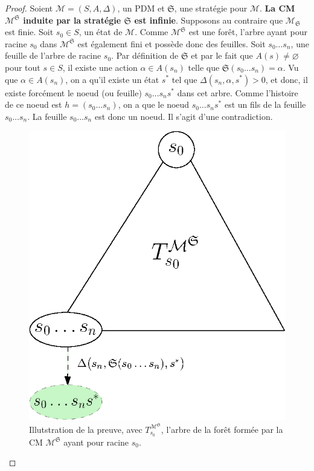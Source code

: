\documentclass[12pt,a4paper]{report}
\theoremstyle{definition}%
\theoremstyle{remark}
\begin{document}
\begin{proof}
	Soient $\mathcal{M} = (S, A, \Delta)$, un PDM et $\mathfrak{S}$, une stratégie pour
	$\mathcal{M}$. \textbf{La CM $\mathcal{M}^\mathfrak{S}$ induite par la stratégie
	$\mathfrak{S}$ est infinie}.
	Supposons au contraire que $\mathcal{M_\mathfrak{S}}$ est finie.
	Soit $s_0 \in S$, un état de $\mathcal{M}$.
	Comme $\mathcal{M}^\mathfrak{S}$ est une forêt, l'arbre ayant pour racine $s_0$ dans
	$\mathcal{M}^\mathfrak{S}$ est également fini et possède donc des feuilles.
	Soit $s_0 \dots s_n$, une feuille de l'arbre de racine $s_0$. Par définition de
	$\mathfrak{S}$ et par le fait que $A(s) \neq \varnothing$ pour tout $s \in S$, il existe une action $\alpha \in A(s_n)$ telle que
	$\mathfrak{S}(s_0 \dots s_n) = \alpha$. Vu que $\alpha \in A(s_n)$, on a qu'il existe un état
	$s^*$ tel que $\Delta(s_n, \alpha, s^*) > 0$, et donc, il existe forcément le noeud (ou feuille) $s_0 \dots s_n s^*$ dans cet arbre. Comme l'histoire de ce noeud
	est $h =(s_0 \dots s_n)$, on a que le noeud $s_0 \dots s_n s^*$ est un
	fils de la feuille $s_0 \dots s_n$. La feuille $s_0 \dots s_n$ est donc un
	noeud. Il s'agit d'une contradiction.
	\begin{figure}[H]
		\centering
		\captionsetup{justification=centering}
		\includegraphics[scale=0.64]{figures/CM-induite-arbre.eps}
		\caption{Illutstration de la preuve, avec $T_{s_0}^{\mathcal{M}^\mathfrak{S}}$,
			l'arbre de la forêt formée par la CM
			$\mathcal{M}^\mathfrak{S}$ ayant pour racine $s_0$.}
	\end{figure}
\end{proof}
\end{document}
